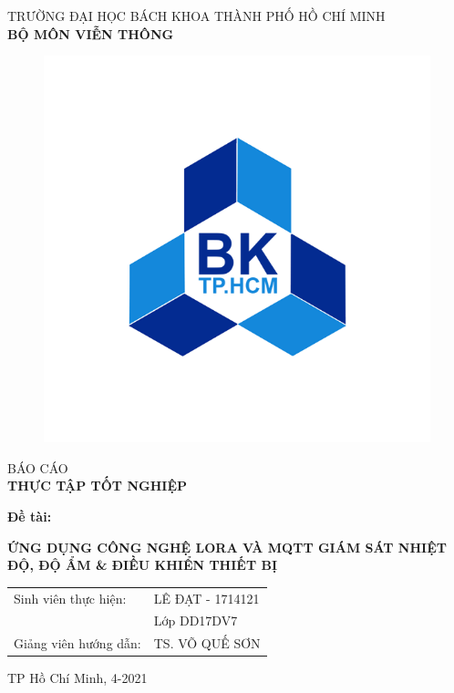\documentclass[13pt,a4paper]{article}
\begin{document}
\begin{titlepage}

\begin{center}
\vspace{-6pt} TRƯỜNG ĐẠI HỌC BÁCH KHOA THÀNH PHỐ HỒ CHÍ MINH\\
\textbf{\fontsize{16pt}{0pt}\selectfont BỘ MÔN VIỄN THÔNG}
\vspace{0.5cm}
\begin{figure}[H]
	\centering
	\includegraphics[scale=.30]{image/bachkhoa.png}
\end{figure}
\vspace{0.5cm}
\fontsize{24pt}{0pt}\selectfont BÁO CÁO\\
\vspace{12pt}
\textbf{\fontsize{32pt}{0pt}\selectfont THỰC TẬP TỐT NGHIỆP}
\vspace{1cm} 
\end{center}
\textbf{\fontsize{14pt}{0pt}\selectfont Đề tài:}
\begin{center}
	\textbf{\fontsize{20pt}{0pt}\selectfont ỨNG DỤNG CÔNG NGHỆ LORA VÀ MQTT GIÁM SÁT NHIỆT ĐỘ, ĐỘ ẨM \& ĐIỀU KHIỂN THIẾT BỊ}\\
\vspace{1.5cm}
\begin{table}[H]
	\centering
	\begin{tabular}{l l}
	\fontsize{14pt}{0pt}\selectfont Sinh viên thực hiện:  &\fontsize{14pt}{0pt}\selectfont LÊ ĐẠT - 1714121 \vspace{6pt}\\
	& Lớp DD17DV7 \vspace{6pt} \\
	\fontsize{14pt}{0pt} \selectfont Giảng viên hướng dẫn:  &\fontsize{14pt}{0pt}\selectfont TS. VÕ QUẾ SƠN\\
	\end{tabular}
\end{table}
\vspace{2cm}
\fontsize{14pt}{0pt} \selectfont TP Hồ Chí Minh, 4-2021
\end{center}
\end{titlepage}
\end{document}
